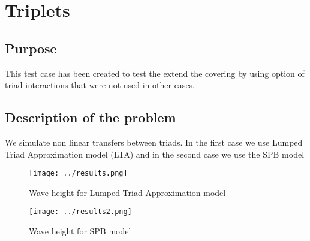 \section{Triplets}
%
%
\subsection{Purpose}
%
This test case has been created to test the extend the covering by using option of triad interactions that were not used in other cases. 

%
\subsection{Description of the problem}
We simulate non linear transfers between triads. In the first case we use Lumped Triad Approximation model (LTA) and in the second case we use the SPB model 
\begin{figure} [!h]
\centering
\texttt{[image: ../results.png]}
 \caption{Wave height for Lumped Triad Approximation model}
\label{figrestripl}
\end{figure}
\begin{figure} [!h]
\centering
\texttt{[image: ../results2.png]}
 \caption{Wave height for SPB model}
\label{figrestripl2}
\end{figure}
